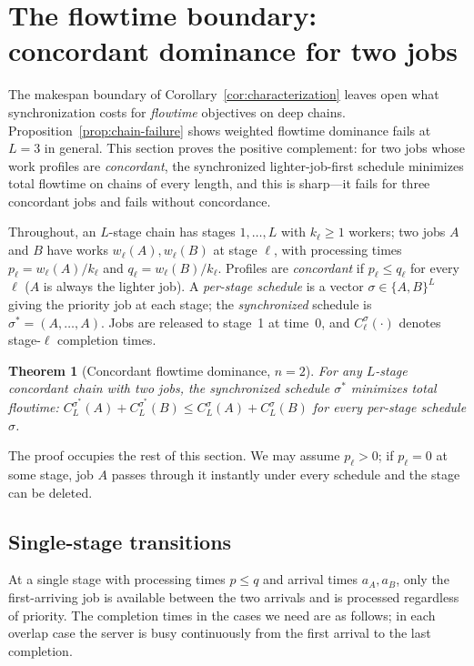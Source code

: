 \documentclass[sn-mathphys,NameDate]{sn-jnl}
\theoremstyle{thmstyleone}
\newtheorem{theorem}{Theorem}
\theoremstyle{thmstylethree}
\theoremstyle{thmstyletwo}
\begin{document}
\section{The flowtime boundary: concordant dominance for two
jobs}
\label{sec:flowtime}

The makespan boundary of
Corollary~\ref{cor:characterization} leaves open what
synchronization costs for \emph{flowtime} objectives on deep
chains. Proposition~\ref{prop:chain-failure} shows weighted
flowtime dominance fails at $L = 3$ in general. This section
proves the positive complement: for two jobs whose work
profiles are \emph{concordant}, the synchronized
lighter-job-first schedule minimizes total flowtime on chains
of every length, and this is sharp---it fails for three
concordant jobs and fails without concordance.

Throughout, an $L$-stage chain has stages $1, \ldots, L$ with
$k_\ell \geq 1$ workers; two jobs $A$ and $B$ have works
$w_\ell(A), w_\ell(B)$ at stage $\ell$, with processing times
$p_\ell = w_\ell(A)/k_\ell$ and $q_\ell = w_\ell(B)/k_\ell$.
Profiles are \emph{concordant} if $p_\ell \leq q_\ell$ for
every $\ell$ ($A$ is always the lighter job). A
\emph{per-stage schedule} is a vector
$\sigma \in \{A, B\}^L$ giving the priority job at each stage;
the \emph{synchronized} schedule is
$\sigma^* = (A, \ldots, A)$. Jobs are released to stage~1 at
time~0, and $C_\ell^\sigma(\cdot)$ denotes stage-$\ell$
completion times.

\begin{theorem}[Concordant flowtime dominance, $n = 2$]
\label{thm:concordant}
For any $L$-stage concordant chain with two jobs, the
synchronized schedule $\sigma^*$ minimizes total flowtime:
$C_L^{\sigma^*}(A) + C_L^{\sigma^*}(B) \leq
 C_L^{\sigma}(A) + C_L^{\sigma}(B)$
for every per-stage schedule $\sigma$.
\end{theorem}

The proof occupies the rest of this section. We may assume
$p_\ell > 0$; if $p_\ell = 0$ at some stage, job $A$ passes
through it instantly under every schedule and the stage can be
deleted.

\subsection{Single-stage transitions}

At a single stage with processing times $p \leq q$ and arrival
times $a_A, a_B$, only the first-arriving job is available
between the two arrivals and is processed regardless of
priority. The completion times in the cases we need are as
follows; in each overlap case the server is busy continuously
from the first arrival to the last completion.
\end{document}
